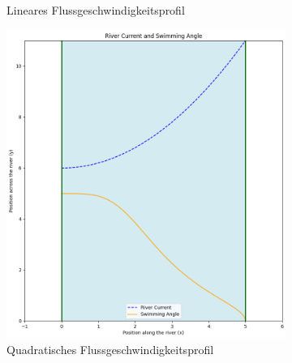 \begin{figure}
\begin{subfigure}{0.48\textwidth}
        \caption{Lineares Flussgeschwindigkeitsprofil}
        \label{fig:diagonal_velocity}
    \end{subfigure}
    \par\bigskip
    \begin{subfigure}{0.48\textwidth}
        \centering
        \includegraphics[width=\textwidth]{papers/schwimmen/Grafiken/squard-crop.png}	
        \caption{Quadratisches Flussgeschwindigkeitsprofil}
        \label{fig:squerd_velocity}
    \end{subfigure}
    \hfill  
    \begin{subfigure}{0.48\textwidth}
        \centering

\end{subfigure}
\end{figure}
